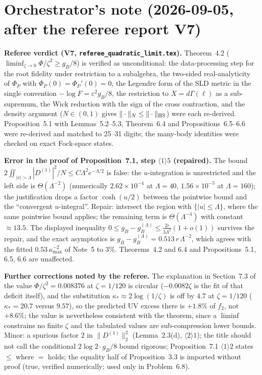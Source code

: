 \documentclass[11pt]{article}
\theoremstyle{definition}\newtheorem{problem}[theorem]{Problem}
\begin{document}
\section*{Orchestrator's note (2026-09-05, after the referee report V7)}
\begin{verdictok}
\textbf{Referee verdict (V7, \texttt{referee\_quadratic\_limit.tex}).} Theorem~4.2 (\(\liminf_{\zeta\to0}\Phi/\zeta^2\ge g_B/8\)) is verified as unconditional: the data-processing step for the root fidelity under restriction to a subalgebra, the two-sided real-analyticity of \(\Phi_P\) with \(\Phi_P(0)=\Phi_P'(0)=0\), the Legendre form of the SLD metric in the single convention \(-\log F=\varepsilon^2g_B/8\), the restriction to \(X=d\Gamma(\ell)\) as a sub-supremum, the Wick reduction with the sign of the cross contraction, and the density argument (\(N\in(0,1)\) gives \(\|\cdot\|_N\le\|\cdot\|_{\rm HS}\)) were each re-derived.  Proposition~5.1 with Lemmas~5.2--5.3, Theorem~6.4 and Propositions~6.5--6.6 were re-derived and matched to 25--31 digits; the many-body identities were checked on exact Fock-space states.
\end{verdictok}
\begin{verdictbreak}
\textbf{Error in the proof of Proposition~7.1, step \(\langle1\rangle5\) (repaired).} The bound \(2\iint_{|v|>\Lambda}|D^{(1)}|^2/N\le C\Lambda^2e^{-\Lambda/2}\) is false: the \(u\)-integration is unrestricted and the left side is \(\Theta(\Lambda^{-2})\) (numerically \(2.62\times10^{-4}\) at \(\Lambda=40\), \(1.56\times10^{-5}\) at \(\Lambda=160\)); the justification drops a factor \(\cosh(u/2)\) between the pointwise bound and the ``convergent \(u\)-integral''.  Repair: intersect the region with \(\{|u|\le\Lambda\}\), where the same pointwise bound applies; the remaining term is \(\Theta(\Lambda^{-4})\) with constant \(\approx13.5\).  The displayed inequality \(0\le g_B-g_B^{(\Lambda)}\le\frac{2r}{3\Lambda^2}(1+o(1))\) survives the repair, and the exact asymptotics is \(g_B-g_B^{(\Lambda)}=0.513\,r\,\Lambda^{-2}\), which agrees with the fitted \(0.53\,\kappa_{\max}^{-2}\) of Note~5 to \(3\%\).  Theorems~4.2 and 6.4 and Propositions~5.1, 6.5, 6.6 are unaffected.
\end{verdictbreak}
\textbf{Further corrections noted by the referee.} The explanation in Section~7.3 of the value \(\Phi/\zeta^2=0.008376\) at \(\zeta=1/120\) is circular (\(-0.0082\zeta\) is the fit of that deficit itself), and the substitution \(\kappa_*\approx2\log(1/\zeta)\) is off by \(4.7\) at \(\zeta=1/120\) (\(\kappa_*=20.7\) versus \(9.57\)), so the predicted UV excess there is \(+1.8\%\) of \(f_2\), not \(+8.6\%\); the value is nevertheless consistent with the theorem, since a \(\liminf\) constrains no finite \(\zeta\) and the tabulated values are sub-compression lower bounds.  Minor: a spurious factor \(2\) in \(\|D^{(1)}\|_2^2\) (Lemma~2.3(d), \(\langle2\rangle1\)); the title should not call the conditional \(2\log2\cdot g_B/8\) bound rigorous; Proposition~7.1 \(\langle1\rangle2\) states \(\le\) where \(=\) holds; the equality half of Proposition~3.3 is imported without proof (true, verified numerically; used only in Problem~6.8).
\end{document}
